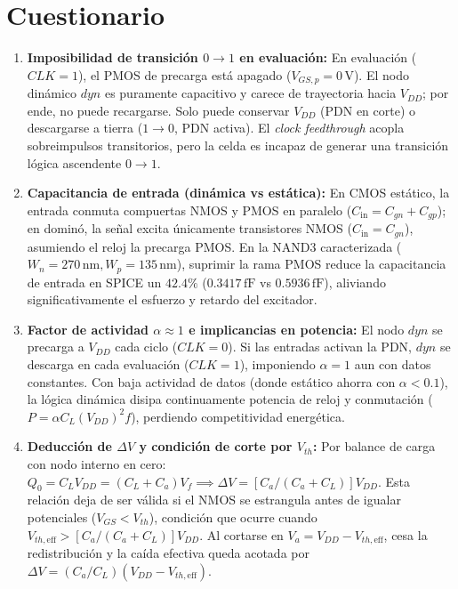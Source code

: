\section{Cuestionario}
\label{sec:cuestionario}

\begin{enumerate}[leftmargin=1.5em,itemsep=0.04em,parsep=0pt,topsep=0.1em]

\item \textbf{Imposibilidad de transición $0 \to 1$ en evaluación:} En evaluación ($CLK=1$), el PMOS de precarga está apagado ($V_{GS,p}=0\,\text{V}$). El nodo dinámico $dyn$ es puramente capacitivo y carece de trayectoria hacia $V_{DD}$; por ende, no puede recargarse. Solo puede conservar $V_{DD}$ (PDN en corte) o descargarse a tierra ($1 \to 0$, PDN activa). El \textit{clock feedthrough} acopla sobreimpulsos transitorios, pero la celda es incapaz de generar una transición lógica ascendente $0 \to 1$.

\item \textbf{Capacitancia de entrada (dinámica vs estática):} En CMOS estático, la entrada conmuta compuertas NMOS y PMOS en paralelo ($C_{\text{in}} = C_{gn} + C_{gp}$); en dominó, la señal excita únicamente transistores NMOS ($C_{\text{in}} = C_{gn}$), asumiendo el reloj la precarga PMOS. En la NAND3 caracterizada ($W_n = 270\,\text{nm}, W_p = 135\,\text{nm}$), suprimir la rama PMOS reduce la capacitancia de entrada en SPICE un $42.4\%$ ($0.3417\,\text{fF}$ vs $0.5936\,\text{fF}$), aliviando significativamente el esfuerzo y retardo del excitador.

\item \textbf{Factor de actividad $\alpha \approx 1$ e implicancias en potencia:} El nodo $dyn$ se precarga a $V_{DD}$ cada ciclo ($CLK=0$). Si las entradas activan la PDN, $dyn$ se descarga en cada evaluación ($CLK=1$), imponiendo $\alpha = 1$ aun con datos constantes. Con baja actividad de datos (donde estático ahorra con $\alpha < 0.1$), la lógica dinámica disipa continuamente potencia de reloj y conmutación ($P = \alpha C_L (V_{DD})^2 f$), perdiendo competitividad energética.

\item \textbf{Deducción de $\Delta V$ y condición de corte por $V_{th}$:} Por balance de carga con nodo interno en cero: $Q_0 = C_L V_{DD} = (C_L+C_a)V_f \implies \Delta V = [C_a/(C_a+C_L)]V_{DD}$. Esta relación deja de ser válida si el NMOS se estrangula antes de igualar potenciales ($V_{GS} < V_{th}$), condición que ocurre cuando $V_{th,\text{eff}} > [C_a/(C_a+C_L)]V_{DD}$. Al cortarse en $V_a = V_{DD} - V_{th,\text{eff}}$, cesa la redistribución y la caída efectiva queda acotada por $\Delta V = (C_a/C_L)(V_{DD} - V_{th,\text{eff}})$.


\end{enumerate}
